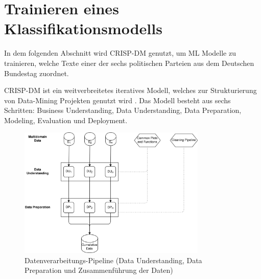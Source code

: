 
\chapter{Trainieren eines Klassifikationsmodells} \label{ch:crispDm_1}



In dem folgenden Abschnitt wird \ac{CRISP-DM} genutzt, um \ac{ML} Modelle zu trainieren, welche Texte einer der sechs politischen Parteien aus dem Deutschen Bundestag zuordnet. 


\ac{CRISP-DM} ist ein weitverbreitetes iteratives Modell, welches zur Strukturierung von Data-Mining Projekten genutzt wird \autocite{martinez-plumed_casp-dm_2017, chapman_crisp-dm_2000}. Das Modell besteht aus sechs Schritten: Business Understanding, Data Understanding, Data Preparation, Modeling, Evaluation und Deployment. 

\begin{figure}[H]
    \centering
    \includegraphics[width=0.8\textwidth]{data/images/data_flow_v2_1.png}
    \caption[Datenverarbeitungs-Pipeline]{Datenverarbeitungs-Pipeline (Data Understanding, Data Preparation und Zusammenführung der Daten)} \label{fig:dataFlow_1}
\end{figure}



